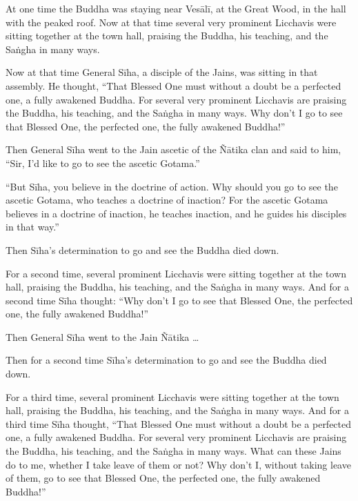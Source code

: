 \documentclass[12pt,openany]{book}%
\begin{document}
At one time the Buddha was staying near \textsanskrit{Vesālī}, at the Great Wood, in the hall with the peaked roof. Now at that time several very prominent Licchavis were sitting together at the town hall, praising the Buddha, his teaching, and the \textsanskrit{Saṅgha} in many ways. 

Now at that time General \textsanskrit{Sīha}, a disciple of the Jains, was sitting in that assembly. He thought, “That Blessed One must without a doubt be a perfected one, a fully awakened Buddha. For several very prominent Licchavis are praising the Buddha, his teaching, and the \textsanskrit{Saṅgha} in many ways. Why don’t I go to see that Blessed One, the perfected one, the fully awakened Buddha!” 

Then General \textsanskrit{Sīha} went to the Jain ascetic of the \textsanskrit{Ñātika} clan and said to him, “Sir, I’d like to go to see the ascetic Gotama.” 

“But \textsanskrit{Sīha}, you believe in the doctrine of action. Why should you go to see the ascetic Gotama, who teaches a doctrine of inaction? For the ascetic Gotama believes in a doctrine of inaction, he teaches inaction, and he guides his disciples in that way.” 

Then \textsanskrit{Sīha}’s determination to go and see the Buddha died down. 

For a second time, several prominent Licchavis were sitting together at the town hall, praising the Buddha, his teaching, and the \textsanskrit{Saṅgha} in many ways. And for a second time \textsanskrit{Sīha} thought: “Why don’t I go to see that Blessed One, the perfected one, the fully awakened Buddha!” 

Then General \textsanskrit{Sīha} went to the Jain \textsanskrit{Ñātika} … 

Then for a second time \textsanskrit{Sīha}’s determination to go and see the Buddha died down. 

For a third time, several prominent Licchavis were sitting together at the town hall, praising the Buddha, his teaching, and the \textsanskrit{Saṅgha} in many ways. And for a third time \textsanskrit{Sīha} thought, “That Blessed One must without a doubt be a perfected one, a fully awakened Buddha. For several very prominent Licchavis are praising the Buddha, his teaching, and the \textsanskrit{Saṅgha} in many ways. What can these Jains do to me, whether I take leave of them or not? Why don’t I, without taking leave of them, go to see that Blessed One, the perfected one, the fully awakened Buddha!” 
\end{document}

